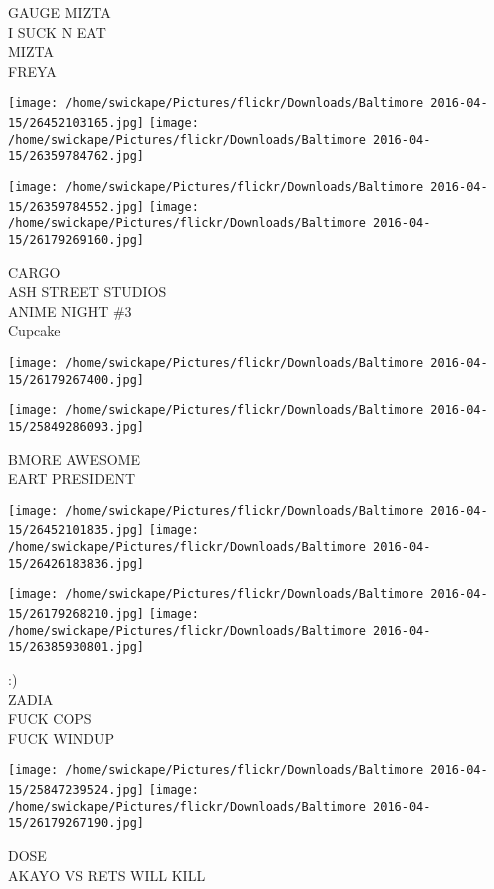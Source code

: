 \documentclass[10pt,letterpaper]{article}
\begin{document}
GAUGE MIZTA\\
I SUCK N EAT\\
MIZTA\\
FREYA\\
\pagebreak

\texttt{[image: /home/swickape/Pictures/flickr/Downloads/Baltimore 2016-04-15/26452103165.jpg]}
\texttt{[image: /home/swickape/Pictures/flickr/Downloads/Baltimore 2016-04-15/26359784762.jpg]}

\texttt{[image: /home/swickape/Pictures/flickr/Downloads/Baltimore 2016-04-15/26359784552.jpg]}
\texttt{[image: /home/swickape/Pictures/flickr/Downloads/Baltimore 2016-04-15/26179269160.jpg]}

CARGO\\
ASH STREET STUDIOS\\
ANIME NIGHT \#3\\
Cupcake\\
\pagebreak

\texttt{[image: /home/swickape/Pictures/flickr/Downloads/Baltimore 2016-04-15/26179267400.jpg]}

\vspace{0.25in}
\texttt{[image: /home/swickape/Pictures/flickr/Downloads/Baltimore 2016-04-15/25849286093.jpg]}

BMORE AWESOME\\
EART PRESIDENT\\
\pagebreak

\texttt{[image: /home/swickape/Pictures/flickr/Downloads/Baltimore 2016-04-15/26452101835.jpg]}
\texttt{[image: /home/swickape/Pictures/flickr/Downloads/Baltimore 2016-04-15/26426183836.jpg]}

\texttt{[image: /home/swickape/Pictures/flickr/Downloads/Baltimore 2016-04-15/26179268210.jpg]}
\texttt{[image: /home/swickape/Pictures/flickr/Downloads/Baltimore 2016-04-15/26385930801.jpg]}

:)\\
ZADIA\\
FUCK COPS\\
FUCK WINDUP\\
\pagebreak

\texttt{[image: /home/swickape/Pictures/flickr/Downloads/Baltimore 2016-04-15/25847239524.jpg]}
\texttt{[image: /home/swickape/Pictures/flickr/Downloads/Baltimore 2016-04-15/26179267190.jpg]}

DOSE\\
AKAYO VS RETS WILL KILL\\
\pagebreak
\end{document}

